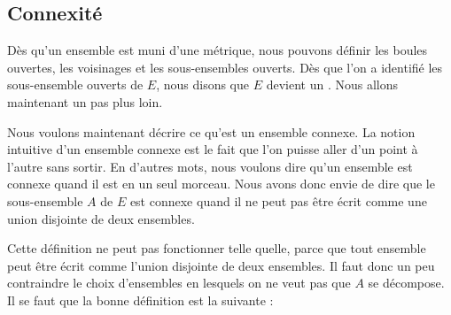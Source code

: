 \subsection{Connexité}

Dès qu'un ensemble est muni d'une métrique, nous pouvons définir les boules ouvertes, les voisinages et les sous-ensembles ouverts. Dès que l'on a identifié les sous-ensemble ouverts de $E$, nous disons que $E$ devient un . Nous allons maintenant un pas plus loin.

Nous voulons maintenant décrire ce qu'est un ensemble connexe. La notion intuitive d'un ensemble connexe est le fait que l'on puisse aller d'un point à l'autre sans sortir. En d'autres mots, nous voulons dire qu'un ensemble est connexe quand il est en un seul morceau. Nous avons donc envie de dire que le sous-ensemble $A$ de $E$ est connexe quand il ne peut pas être écrit comme une union disjointe de deux ensembles.

Cette définition ne peut pas fonctionner telle quelle, parce que tout ensemble peut être écrit comme l'union disjointe de deux ensembles. Il faut donc un peu contraindre le choix d'ensembles en lesquels on ne veut pas que $A$ se décompose. Il se faut que la bonne définition est la suivante :

